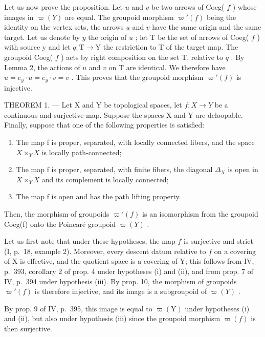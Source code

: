 Let us now prove the proposition. Let \(u\) and \(v\) be two arrows of Coeg( \(f\) ) whose images in \(\varpi(Y)\) are equal. The groupoid morphism \(\varpi'(f)\) being the identity on the vertex sets, the arrows \(u\) and \(v\) have the same origin and the same target. Let us denote by \(y\) the origin of \(u\) ; let T be the set of arrows of Coeg( \(f\) ) with source y and let \(q: \mathrm{T} \to \mathrm{Y}\) the restriction to T of the target map. The groupoid Coeg( \(f\) ) acts by right composition on the set T, relative to \(q\) . By Lemma 2, the actions of \(u\) and \(v\) on T are identical. We therefore have \(u = e_y \cdot u = e_y \cdot v = v\) . This proves that the groupoid morphism \(\varpi'(f)\) is injective.

THEOREM 1. --- Let X and Y be topological spaces, let \(f: X \to Y\) be a continuous and surjective map. Suppose the spaces X and Y are deloopable. Finally, suppose that one of the following properties is satisfied:

\begin{enumerate}
\def\labelenumi{(\roman{enumi})}
\item
  The map f is proper, separated, with locally connected fibers, and the space \(X\times_{Y}X\) is locally path-connected;
\item
  The map f is proper, separated, with finite fibers, the diagonal \(\Delta_{X}\) is open in \(X \times_{Y} X\) and its complement is locally connected;
\item
  The map f is open and has the path lifting property.
\end{enumerate}

Then, the morphism of groupoids \(\varpi'(f)\) is an isomorphism from the groupoid Coeg(f) onto the Poincaré groupoid \(\varpi(Y)\) .

Let us first note that under these hypotheses, the map \(f\) is surjective and strict (I, p.~18, example 2). Moreover, every descent datum relative to \(f\) on a covering of X is effective, and the quotient space is a covering of Y; this follows from IV, p.~393, corollary 2 of prop. 4 under hypotheses (i) and (ii), and from prop. 7 of IV, p.~394 under hypothesis (iii). By prop. 10, the morphism of groupoids \(\varpi'(f)\) is therefore injective, and its image is a subgroupoid of \(\varpi(Y)\) .

By prop. 9 of IV, p.~395, this image is equal to \(\varpi(\mathrm{Y})\) under hypotheses (i) and (ii), but also under hypothesis (iii) since the groupoid morphism \(\varpi(f)\) is then surjective.

